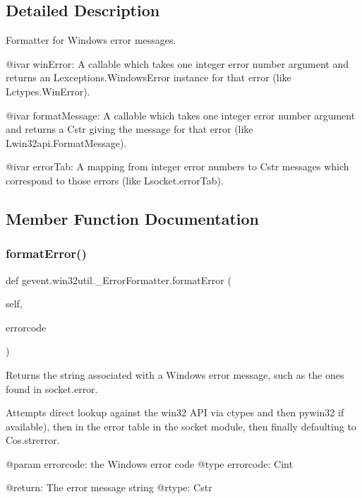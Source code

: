 \subsection{Detailed Description}
\begin{DoxyVerb}Formatter for Windows error messages.

@ivar winError: A callable which takes one integer error number argument
    and returns an L{exceptions.WindowsError} instance for that error (like
    L{ctypes.WinError}).

@ivar formatMessage: A callable which takes one integer error number
    argument and returns a C{str} giving the message for that error (like
    L{win32api.FormatMessage}).

@ivar errorTab: A mapping from integer error numbers to C{str} messages
    which correspond to those errors (like L{socket.errorTab}).
\end{DoxyVerb}
 

\subsection{Member Function Documentation}
\mbox{\label{classgevent_1_1win32util_1_1___error_formatter_ad2de43218a67eb8f265c1db29450dec2}} 
\subsubsection{\texorpdfstring{format\+Error()}{formatError()}}
{\footnotesize\ttfamily def gevent.\+win32util.\+\_\+\+Error\+Formatter.\+format\+Error (\begin{DoxyParamCaption}\item[{}]{self,  }\item[{}]{errorcode }\end{DoxyParamCaption})}

\begin{DoxyVerb}Returns the string associated with a Windows error message, such as the
ones found in socket.error.

Attempts direct lookup against the win32 API via ctypes and then
pywin32 if available), then in the error table in the socket module,
then finally defaulting to C{os.strerror}.

@param errorcode: the Windows error code
@type errorcode: C{int}

@return: The error message string
@rtype: C{str}
\end{DoxyVerb}
 \mbox{\label{classgevent_1_1win32util_1_1___error_formatter_ad5e16793772869bf37441b45203f3ced}} 
